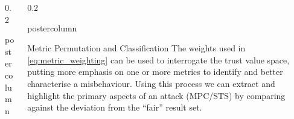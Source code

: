 \documentclass[final,hyperref={pdfpagelabels=false}]{beamer}
\def\colwidth{0.2\linewidth}
\begin{document}
\begin{frame}[fragile]
\begin{columns}[T]
\begin{column}{\colwidth}
\begin{beamercolorbox}[center,wd=\textwidth]{postercolumn}
\begin{minipage}[T]{.98\textwidth}
{						%


						
					}
				\end{minipage}
			\end{beamercolorbox}
		\end{column}
				
		\begin{column}{\colwidth}
			\begin{beamercolorbox}[center,wd=\textwidth]{postercolumn}
				\begin{minipage}[T]{.98\textwidth} %
					\parbox[t]{\textwidth}{ %

						\begin{block}{Metric Permutation and Classification}
							The weights used in \eqref{eq:metric_weighting} can be used to interrogate the trust value space, putting more emphasis on one or more metrics to identify and better characterise a misbehaviour.
							Using this process we can extract and highlight the primary aspects of an attack (MPC/STS) by comparing against the deviation from the ``fair'' result set. 
							

\end{block}}
\end{minipage}
\end{beamercolorbox}
\end{column}
\end{columns}
\end{frame}
\end{document}
